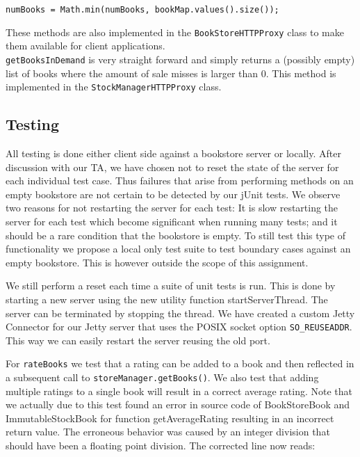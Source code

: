 \documentclass[11pt]{article}
\begin{document}
\begin{center}
\texttt{numBooks = Math.min(numBooks, bookMap.values().size());}
\end{center}

These methods are also implemented in the \texttt{BookStoreHTTPProxy} class to
make them available for client applications.\\

\texttt{getBooksInDemand} is very straight forward and simply returns a
(possibly empty) list of books where the amount of sale misses is larger than
0. This method is implemented in the \texttt{StockManagerHTTPProxy} class.

\subsection*{Testing}

All testing is done either client side against a bookstore server or locally. After discussion with our TA, we have chosen not to reset the state of the server for each individual test case. Thus failures that arise from performing methods on an empty bookstore are not certain to be detected by our jUnit tests. We observe two reasons for not restarting the server for each test: It is slow restarting the server for each test which become significant when running many tests; and it should be a rare condition that the bookstore is empty. To still test this type of functionality we propose a local only test suite to test boundary cases against an empty bookstore. This is however outside the scope of this assignment.

We still perform a reset each time a suite of unit tests is run. This is done by starting a new server using the new utility function startServerThread. The server can be terminated by stopping the thread. We have created a custom Jetty Connector for our Jetty server that uses the POSIX socket option \texttt{SO\_REUSEADDR}. This way we can easily restart the server reusing the old port.

For \texttt{rateBooks} we test that a rating can be added to a book and then reflected in a subsequent call to \texttt{storeManager.getBooks()}. We also test that adding multiple ratings to a single book will result in a correct average rating. Note that we actually due to this test found an error in source code of BookStoreBook and ImmutableStockBook for function getAverageRating resulting in an incorrect return value. The erroneous behavior was caused by an integer division that should have been a floating point division. The corrected line now reads:
\end{document}
